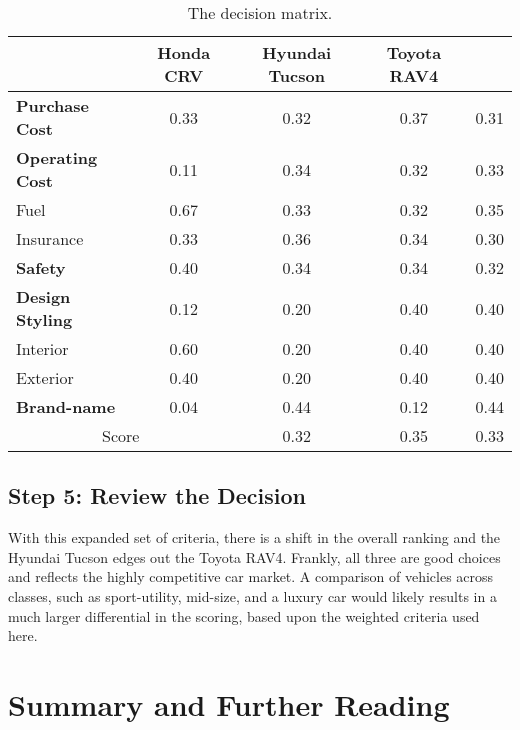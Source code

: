 \begin{table}[h]
\caption{The decision matrix.}
\label{table:decisionMatrixCarPurchase}

\begin{tabular}{|l|c|c|c|c|}
\hline
\rowcolor{Gray}
\multicolumn{2}{|c|}{}	 & \textbf{Honda CRV}  & \textbf{Hyundai Tucson} & \textbf{Toyota RAV4} \\ \hline
\textbf{Purchase Cost} & 0.33 & 0.32 & 0.37 & 0.31 \\ \hline
\textbf{Operating Cost} & 0.11 & 0.34 & 0.32 & 0.33 \\ \hline
\hspace{1em}Fuel & 0.67 &0.33 &0.32 &0.35 \\ \hline
\hspace{1em}Insurance & 0.33 & 0.36 & 0.34 & 0.30 \\ \hline
\textbf{Safety} & 0.40 & 0.34 & 0.34 & 0.32 \\ \hline
\textbf{Design Styling} & 0.12 & 0.20 & 0.40 & 0.40 \\ \hline
\hspace{1em}Interior & 0.60& 0.20 & 0.40 & 0.40 \\ \hline
\hspace{1em}Exterior & 0.40 &  0.20 & 0.40& 0.40 \\ \hline
\textbf{Brand-name} & 0.04 & 0.44 & 0.12 & 0.44 \\ \hline
\multicolumn{2}{|c|}{Score} & 0.32 & 0.35 & 0.33 \\ \hline
\end{tabular}
\end{table}

\subsection*{Step 5: Review the Decision}

With this expanded set of criteria, there is a shift in the overall
ranking and the Hyundai Tucson edges out the Toyota RAV4. Frankly, all
three are good choices and reflects the highly competitive car market. A
comparison of vehicles across classes, such as sport-utility, mid-size,
and a luxury car would likely results in a much larger differential in
the scoring, based upon the weighted criteria used here.

\section{Summary and Further Reading}

